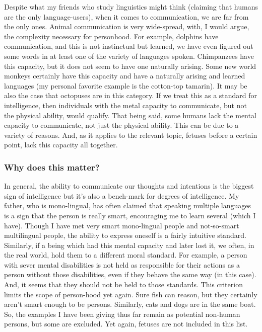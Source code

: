 Despite what my friends who study linguistics might think (claiming that humans are the only language-users), when it comes to communication, we are far from the only ones. Animal communication is very wide-spread, with, I would argue, the complexity necessary for personhood. For example, dolphins have communication, and this is not instinctual but learned, we have even figured out some words in at least one of the variety of languages spoken.\autocite{tedtalksdirector2013} Chimpanzees have this capacity, but it does not seem to have one naturally arising. Some new world monkeys certainly have this capacity and have a naturally arising and learned languages (my personal favorite example is the cotton-top tamarin)\autocite{tededucation2014}. It may be also the case that octopuses are in this category.  If we treat this as a standard for intelligence, then individuals with the metal capacity to communicate, but not the physical ability, would qualify. That being said, some humans lack the mental capacity to communicate, not just the physical ability. This can be due to a variety of reasons.  And, as it applies to the relevant topic, fetuses before a certain point, lack this capacity all together.
\subsubsection{Why does this matter?}

In general, the ability to communicate our thoughts and intentions is the biggest sign of intelligence but it's also a bench-mark for degrees of intelligence. My father, who is mono-lingual, has often claimed that speaking multiple languages is a sign that the person is really smart, encouraging me to learn several (which I have). Though I have met very smart mono-lingual people and not-so-smart multilingual people, the ability to express oneself is a fairly intuitive standard. Similarly, if a being which had this mental capacity and later lost it, we often, in the real world, hold them to a different moral standard. For example, a person with sever mental disabilities is not held as responsible for their actions as a person without those disabilities, even if they behave the same way (in this case). And, it seems that they should not be held to those standards. This criterion limits the scope of person-hood yet again. Sure fish can reason, but they certainly aren't smart enough to be persons. Similarly, cats and dogs are in the same boat. So, the examples I have been giving thus far remain as potential non-human persons, but some are excluded. Yet again, fetuses are not included in this list. 
